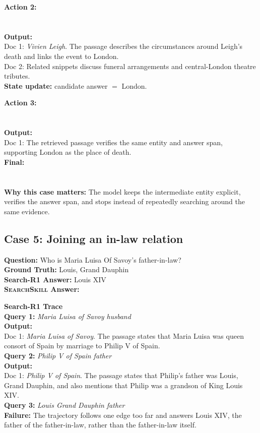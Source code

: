 \documentclass{article}
\newcommand{\Ours}{\textsc{SearchSkill}\xspace}
\begin{document}
\textbf{Action 2:}\\
\\
\\
\textbf{Output:}\\
Doc 1: \emph{Vivien Leigh}. The passage describes the circumstances around Leigh's death and links the event to London.\\
Doc 2: Related snippets discuss funeral arrangements and central-London theatre tributes.\\
\textbf{State update:} candidate answer \(=\) London.

\textbf{Action 3:}\\
\\
\\
\textbf{Output:}\\
Doc 1: The retrieved passage verifies the same entity and answer span, supporting London as the place of death.\\
\textbf{Final:}\\
\\
\\
\textbf{Why this case matters:} The model keeps the intermediate entity explicit, verifies the answer span, and stops instead of repeatedly searching around the same evidence.
\casehr

\subsection{Case 5: Joining an in-law relation}
\casehr
\small
\noindent\textbf{Question:} Who is Maria Luisa Of Savoy's father-in-law?\\
\textbf{Ground Truth:} Louis, Grand Dauphin\\
\textbf{Search-R1 Answer:} Louis XIV\\
\textbf{\Ours Answer:} 

\casedash
\noindent\textcolor{red!75!black}{\textbf{Search-R1 Trace}}\\
\textbf{Query 1:} \emph{Maria Luisa of Savoy husband}\\
\textbf{Output:}\\
Doc 1: \emph{Maria Luisa of Savoy}. The passage states that Maria Luisa was queen consort of Spain by marriage to Philip V of Spain.\\
\textbf{Query 2:} \emph{Philip V of Spain father}\\
\textbf{Output:}\\
Doc 1: \emph{Philip V of Spain}. The passage states that Philip's father was Louis, Grand Dauphin, and also mentions that Philip was a grandson of King Louis XIV.\\
\textbf{Query 3:} \emph{Louis Grand Dauphin father}\\
\textbf{Failure:} The trajectory follows one edge too far and answers Louis XIV, the father of the father-in-law, rather than the father-in-law itself.
\end{document}
